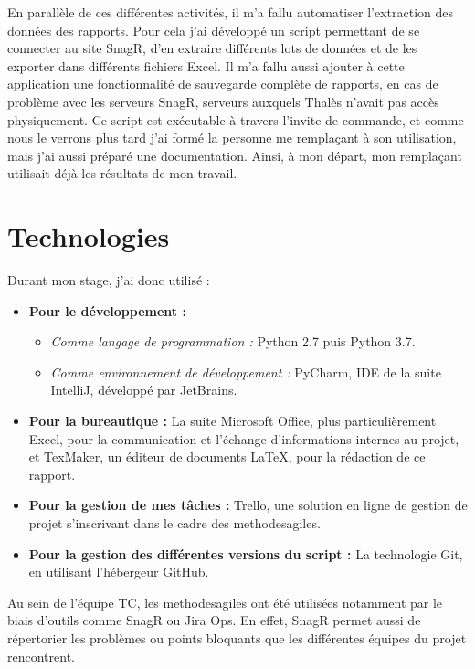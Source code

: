 En parallèle de ces différentes activités, il m'a fallu automatiser l'extraction des données des rapports. Pour cela j'ai développé un script permettant de se connecter au site \gls{SnagR}, d'en extraire différents lots de données et de les exporter dans différents fichiers Excel. Il m'a fallu aussi ajouter à cette application une fonctionnalité de sauvegarde complète de rapports, en cas de problème avec les serveurs SnagR, serveurs auxquels Thalès n'avait pas accès physiquement.
Ce script est exécutable à travers l'invite de commande, et comme nous le verrons plus tard j'ai formé la personne me remplaçant à son utilisation, mais j'ai aussi préparé une documentation. Ainsi, à mon départ, mon remplaçant utilisait déjà les résultats de mon travail.

\newpage
\section{Technologies}
Durant mon stage, j'ai donc utilisé :
\begin{itemize}
\item \textbf{Pour le développement :}
\begin{itemize}
\item \textit{Comme langage de programmation :} Python 2.7 puis Python 3.7.
\item \textit{Comme environnement de développement :} PyCharm, \gls{IDE} de la suite IntelliJ, développé par JetBrains.
\end{itemize}
\item \textbf{Pour la bureautique :} La suite Microsoft Office, plus particulièrement Excel, pour la communication et l'échange d'informations internes au projet, et TexMaker, un éditeur de documents \gls{LaTeX}, pour la rédaction de ce rapport.
\item \textbf{Pour la gestion de mes tâches :} Trello, une solution en ligne de gestion de projet s'inscrivant dans le cadre des \gls{methodesagiles}.
\item \textbf{Pour la gestion des différentes versions du script :} La technologie \gls{Git}, en utilisant l'hébergeur GitHub.
\end{itemize}

Au sein de l'équipe \gls{TC}, les \gls{methodesagiles} ont été utilisées notamment par le biais d'outils comme \gls{SnagR} ou Jira Ops. En effet, \gls{SnagR} permet aussi de répertorier les problèmes ou points bloquants que les différentes équipes du projet rencontrent.


